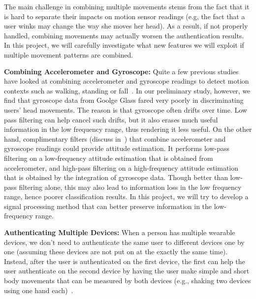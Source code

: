 The main challenge in combining multiple movements stems from the fact that it is hard to separate their impacts on motion sensor readings (e.g, the fact that a user winks may change the way she moves her head). As a result, if not properly handled, combining movements may actually worsen the authentication results. In this project, we will carefully investigate what new features we will exploit if multiple movement patterns are combined.

\vspace{4pt}\textbf{Combining Accelerometer and Gyroscope:} Quite a few previous studies have looked at combining accelerometer and gyroscope readings to detect motion contexts such as walking, standing or fall~\cite{mayagoitia2002accelerometer,jovanov2005wireless,li2009accurate,zhu2004real,williamson2001detecting,sabatini2005assessment}. In our preliminary study, however, we find that gyroscope data from Goolge Glass fared very poorly in discriminating users' head movements. The reason is that gyroscope often drifts over time. Low pass filtering can help cancel such drifts, but it also erases much useful information in the low frequency range, thus rendering it less useful. On the other hand,  complimentary filters (discuss in~\cite{euston2008complementary}) that combine accelerometer and gyroscope readings could provide attitude estimation. It performs low-pass filtering on a low-frequency attitude estimation that is obtained from accelerometer, and high-pass filtering on a high-frequency attitude estimation that is obtained by the integration of  gyroscope data. Though better than low-pass filtering alone, this may also lead to information loss in the low frequency range, hence poorer classification results. In this project, we will try to develop a signal processing method that can better preserve information in the low-frequency range.

\vspace{4pt}\textbf{Authenticating Multiple Devices:} When a person has multiple wearable devices, we don't need to authenticate the same user to different devices one by one (assuming these devices are not put on at the exactly the same time). Instead, after the user is authenticated on the first device, the first can help the user authenticate on the second device by having the user make simple and short body movements that can be measured by both devices (e.g., shaking two devices using one hand each)~\cite{mayrhofer2007shake,patel2004gesture}.


